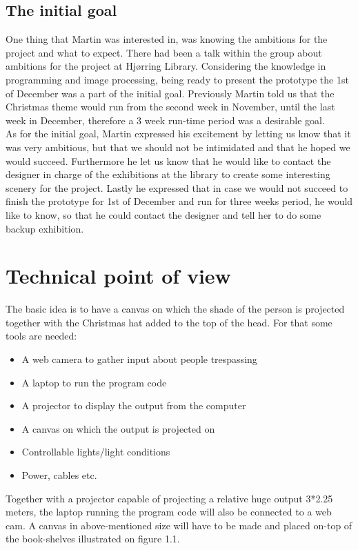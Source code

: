 \subsection{The initial goal}
One thing that Martin was interested in, was knowing the ambitions for the project and what to expect. There had been a talk within the group about ambitions for the project at Hjørring Library. Considering the knowledge in programming and image processing, being ready to present the prototype the 1st of December was a part of the initial goal. Previously Martin told us that the Christmas theme would run from the second week in November, until the last week in December, therefore a 3 week run-time period was a desirable goal.\\
As for the initial goal, Martin expressed his excitement by letting us know that it was very ambitious, but that we should not be intimidated and that he hoped we would succeed. Furthermore he let us know that he would like to contact the designer in charge of the exhibitions at the library to create some interesting scenery for the project. Lastly he expressed that in case we would not succeed to finish the prototype for 1st of December and run for three weeks period, he would like to know, so that he could contact the designer and tell her to do some backup exhibition.

\section{Technical point of view}
The basic idea is to have a canvas on which the shade of the person is projected together with the Christmas hat added to the top of the head. For that some tools are needed:

\begin{itemize}
\item A web camera to gather input about people trespassing
\item A laptop to run the program code
\item A projector to display the output from the computer
\item A canvas on which the output is projected on
\item Controllable lights/light conditions
\item Power, cables etc.
\end{itemize}

Together with a projector capable of projecting a relative huge output 3*2.25 meters, the laptop running the program code will also be connected to a web cam. A canvas in above-mentioned size will have to be made and placed on-top of the book-shelves illustrated on figure 1.1.

